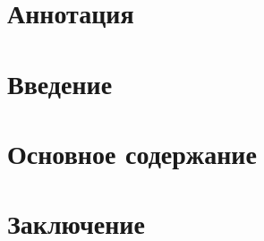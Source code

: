 \documentclass{mipt-thesis-bs}
\begin{document}
\setcounter{page}{2}
\chapter{Аннотация}


\newpage
\tableofcontents
\newpage

\chapter{Введение}


\chapter{Основное содержание}


\chapter{Заключение}


\printbib
\end{document}
